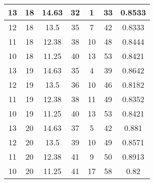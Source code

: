 \documentclass[letterpaper, 12pt]{article}
\begin{document}
\begin{longtable}{|c|c|c|c|c|c|c|}
\hline
13 & 18 & 14.63 & 32 & 1 & 33 & 0.8533 \\
\hline
12 & 18 & 13.5 & 35 & 7 & 42 & 0.8333 \\
\hline
11 & 18 & 12.38 & 38 & 10 & 48 & 0.8444 \\
\hline
10 & 18 & 11.25 & 40 & 13 & 53 & 0.8421 \\
\hline
13 & 19 & 14.63 & 35 & 4 & 39 & 0.8642 \\
\hline
12 & 19 & 13.5 & 36 & 10 & 46 & 0.8182 \\
\hline
11 & 19 & 12.38 & 38 & 11 & 49 & 0.8352 \\
\hline
10 & 19 & 11.25 & 40 & 13 & 53 & 0.8421 \\
\hline
13 & 20 & 14.63 & 37 & 5 & 42 & 0.881 \\
\hline
12 & 20 & 13.5 & 39 & 10 & 49 & 0.8571 \\
\hline
11 & 20 & 12.38 & 41 & 9 & 50 & 0.8913 \\
\hline
10 & 20 & 11.25 & 41 & 17 & 58 & 0.82 \\
\hline
\end{longtable}
\end{document}
